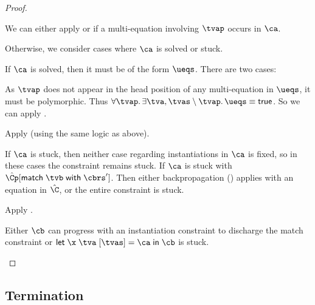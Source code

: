 \documentclass[acmsmall,screen,nonacm,review]{acmart}
\begin{document}
\begin{proof}
\begin{proofcases}
\begin{proofcases}
\begin{proofcases}
	  \proofcase{$\hat\C\where{\cpapp \x \tvp \tvc \inst}$}
	    \begin{itemize}
	      \proofcase{$\tvp \in \reg \tv \tvs$}

		We can either apply  or 
		if a multi-equation involving $\tvp$ occurs in $\ca$.

		Otherwise, we consider cases where $\ca$ is solved or stuck.

		If $\ca$ is solved, then it must be of the form $\ueqs$.
		There are two cases:
		\begin{itemize}
		  \proofcase{$\cexists {\tv, \tvs} \ueqs \cequiv \ctrue$}
		  As $\tvp$ does not appear in the head position of any multi-equation in $\ueqs$,
		  it must be polymorphic. Thus $\cfor \tvp {\cexists {\tv, \tvs \setminus \tvp} \ueqs} \cequiv \ctrue$.
		  So we can apply .

		  \proofcase{$\cexists {\tv, \tvs} \ueqs \cnequiv \ctrue$}
		  Apply  (using the same logic as above).

		\end{itemize}

		If $\ca$ is stuck, then neither case regarding instantiations
		in $\ca$ is fixed, so in these cases the constraint remains
		stuck. If $\ca$ is stuck with $\hat\Cp\where{\cmatch \tvb
		\cbrs'}$. Then either backpropagation ()
		applies with an equation in $\hat\C$, or the entire constraint
		is stuck.

		\proofcase{$\tvp \notin \reg \tv \tvs$} Apply .




	    \end{itemize}

	  \proofcase{$\hat\C\where{\cmatch \tvp \cbrs}$}

	  Either $\cb$ can progress with an instantiation constraint to discharge
	  the match constraint or $\cletr \x \tv \tvs \ca \cb$ is stuck.
	\end{proofcases}

    \end{proofcases}


  \end{proofcases}
\end{proof}

\subsection{Termination}
\end{document}
